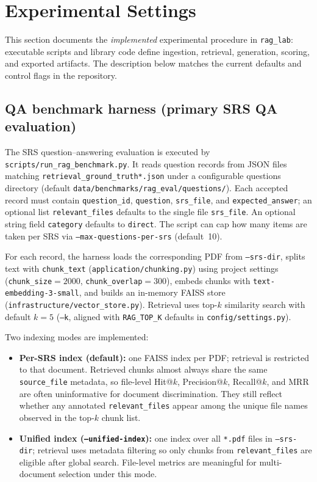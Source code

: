 \documentclass[conference]{IEEEtran}
\begin{document}
\section{Experimental Settings}
\label{sec:experiments}

This section documents the \emph{implemented} experimental procedure in \texttt{rag\_lab}: executable scripts and library code define ingestion, retrieval, generation, scoring, and exported artifacts. The description below matches the current defaults and control flags in the repository.

\subsection{QA benchmark harness (primary SRS QA evaluation)}

The SRS question--answering evaluation is executed by \texttt{scripts/run\_rag\_benchmark.py}. It reads question records from JSON files matching \texttt{retrieval\_ground\_truth*.json} under a configurable questions directory (default \texttt{data/benchmarks/rag\_eval/questions/}). Each accepted record must contain \texttt{question\_id}, \texttt{question}, \texttt{srs\_file}, and \texttt{expected\_answer}; an optional list \texttt{relevant\_files} defaults to the single file \texttt{srs\_file}. An optional string field \texttt{category} defaults to \texttt{direct}. The script can cap how many items are taken per SRS via \texttt{--max-questions-per-srs} (default~10).

For each record, the harness loads the corresponding PDF from \texttt{--srs-dir}, splits text with \texttt{chunk\_text} (\texttt{application/chunking.py}) using project settings (\texttt{chunk\_size}${=}2000$, \texttt{chunk\_overlap}${=}300$), embeds chunks with \texttt{text-embedding-3-small}, and builds an in-memory FAISS store (\texttt{infrastructure/vector\_store.py}). Retrieval uses top-$k$ similarity search with default $k{=}5$ (\texttt{--k}, aligned with \texttt{RAG\_TOP\_K} defaults in \texttt{config/settings.py}).

Two indexing modes are implemented:

\begin{itemize}
    \item \textbf{Per-SRS index (default):} one FAISS index per PDF; retrieval is restricted to that document. Retrieved chunks almost always share the same \texttt{source\_file} metadata, so file-level Hit@$k$, Precision@$k$, Recall@$k$, and MRR are often uninformative for document discrimination. They still reflect whether any annotated \texttt{relevant\_files} appear among the unique file names observed in the top-$k$ chunk list.
    \item \textbf{Unified index (\texttt{--unified-index}):} one index over all \texttt{*.pdf} files in \texttt{--srs-dir}; retrieval uses metadata filtering so only chunks from \texttt{relevant\_files} are eligible after global search. File-level metrics are meaningful for multi-document selection under this mode.
\end{itemize}
\end{document}
